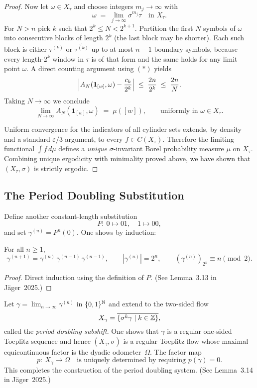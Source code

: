 \begin{proof}
	\medskip
	Now let $\omega\in X_\tau$ and choose integers $m_j\to\infty$ with
	\[
	\omega\;=\;\lim_{j\to\infty}\sigma^{m_j}\tau
	\quad\text{in }X_\tau.
	\]
	For $N>n$ pick $k$ such that $2^{k}\le N<2^{k+1}$.
	Partition the first $N$ symbols of $\omega$ into consecutive blocks of
	length $2^{k}$ (the last block may be shorter).
	Each such block is either $\tau^{(k)}$ or $\widetilde{\tau^{(k)}}$ up to at
	most $n-1$ boundary symbols, because every length-$2^{k}$ window in
	$\tau$ is of that form and the same holds for any limit point
	$\omega$.
	A direct counting argument using $(\ast)$ yields
	\[
	\Bigl|A_N(\mathbf 1_{[w]},\omega)-\frac{c_k}{2^{k}}\Bigr|
	\;\le\;\frac{2n}{2^{k}}
	\;\le\;\frac{2n}{N}.
	\]
	Taking $N\to\infty$ we conclude
	\[
	\lim_{N\to\infty}A_N(\mathbf 1_{[w]},\omega)\;=\;\mu([w]),
	\qquad
	\text{uniformly in }\omega\in X_\tau.
	\]

	\medskip
	Uniform convergence for the indicators of all cylinder sets extends,
	by density and a standard $\varepsilon/3$ argument, to every
	$f\in C(X_\tau)$.
	Therefore the limiting functional $\int f\,d\mu$ defines a
	\emph{unique} $\sigma$-invariant Borel probability measure $\mu$ on
	$X_\tau$.
	Combining unique ergodicity with minimality proved above, we have
	shown that $(X_\tau,\sigma)$ is strictly ergodic.
	\qedhere
\end{proof}

\subsection{The Period Doubling Substitution}
Define another constant‑length substitution
\[
P:\ 0 \mapsto 01,\quad 1 \mapsto 00,
\]
and set $\gamma^{(n)}=P^n(0)$.  One shows by induction:
\begin{lemma}\label{lem:pd-recursion}
For all $n\ge1$,
\[
\gamma^{(n+1)} = \gamma^{(n)}\,\gamma^{(n-1)}\,\gamma^{(n-1)},
\qquad |\gamma^{(n)}|=2^n,
\qquad (\gamma^{(n)})_{2^n}\equiv n\pmod2.
\]
\end{lemma}
\begin{proof}
Direct induction using the definition of $P$.  (See Lemma 3.13 in Jäger 2025.)
\end{proof}

Let $\gamma=\lim_{n\to\infty}\gamma^{(n)}$ in $\{0,1\}^{\mathbb{N}}$ and extend to the two‑sided flow
\[
X_\gamma=\overline{\{\sigma^k\gamma\mid k\in\mathbb{Z}\}},
\]
called the \emph{period doubling subshift}.  One shows that $\gamma$ is a regular one‑sided
Toeplitz sequence and hence $(X_\gamma,\sigma)$ is a regular Toeplitz flow whose maximal equi\-con\-ti\-nuous factor is the dyadic odometer~$\Omega$.  The factor map
\[
p:\ X_\gamma\to\Omega
\quad\text{is uniquely determined by requiring }p(\gamma)=0.
\]
This completes the construction of the period doubling system.  (See Lemma 3.14 in Jäger 2025.)

